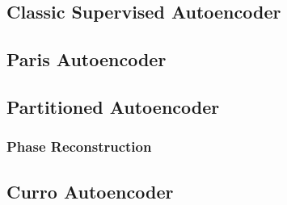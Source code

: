 \subsection{Classic Supervised Autoencoder}


\subsection{Paris Autoencoder}


\subsection{Partitioned Autoencoder}

\subsubsection{Phase Reconstruction}

\subsection{Curro Autoencoder}


